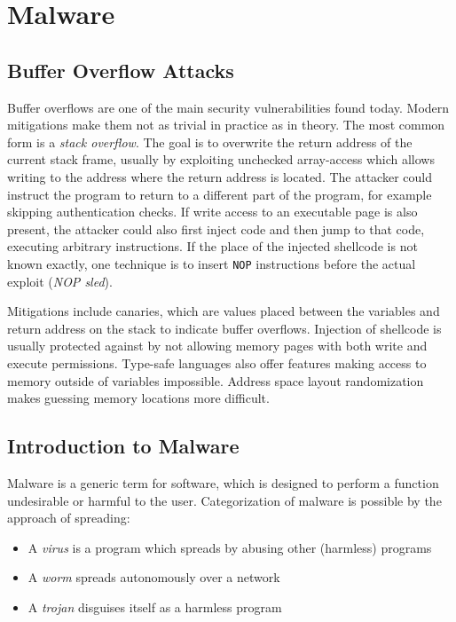 \chapter{Malware}
\section{Buffer Overflow Attacks}
Buffer overflows are one of the main security vulnerabilities found today.
Modern mitigations make them not as trivial in practice as in theory. The most
common form is a \emph{stack overflow}. The goal is to overwrite the return
address of the current stack frame, usually by exploiting unchecked array-access
which allows writing to the address where the return address is located. The
attacker could instruct the program to return to a different part of the
program, for example skipping authentication checks. If write access to an
executable page is also present, the attacker could also first inject code and
then jump to that code, executing arbitrary instructions. If the place of the
injected shellcode is not known exactly, one technique is to insert \texttt{NOP}
instructions before the actual exploit (\textit{NOP sled}).

Mitigations include canaries, which are values placed between the variables and
return address on the stack to indicate buffer overflows. Injection of shellcode
is usually protected against by not allowing memory pages with both write and
execute permissions. Type-safe languages also offer features making access to
memory outside of variables impossible. Address space layout randomization makes
guessing memory locations more difficult.


\section{Introduction to Malware}
Malware is a generic term for software, which is designed to perform a function
undesirable or harmful to the user. Categorization of malware is possible by the
approach of spreading:
\begin{itemize}
    \item A \emph{virus} is a program which spreads by abusing other (harmless)
          programs
    \item A \emph{worm} spreads autonomously over a network
    \item A \emph{trojan} disguises itself as a harmless program
\end{itemize}


